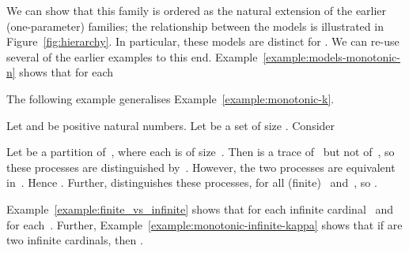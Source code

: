 We can show that this family is ordered as the natural extension of the
earlier (one-parameter) families; the relationship between the models is
illustrated in Figure~\ref{fig:hierarchy}.  In particular, these models are
distinct for .  We can re-use several of the earlier examples to
this end.
Example~\ref{example:models-monotonic-n} shows that for each~

The following example generalises Example~\ref{example:monotonic-k}.
\begin{example}
Let  and  be positive natural numbers.  Let  be a set of size
.    Consider

Let  be a partition of~, where each  is of
size~.  Then  is a trace of~
but not of~, so these processes are distinguished by~.
However, the two processes are equivalent in~.  Hence
.  Further,
 distinguishes these processes, for all
(finite)~ and~, so .
\end{example}
Example~\ref{example:finite_vs_infinite} shows that
 for each infinite
cardinal~ and for each~.  Further,
Example~\ref{example:monotonic-infinite-kappa} shows that if  are two infinite cardinals, then .








